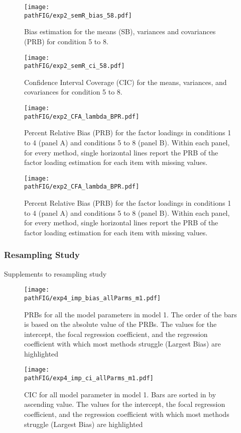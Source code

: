 \documentclass[]{./cls/interact}
\theoremstyle{plain}
\theoremstyle{definition}
\theoremstyle{remark}
\newcommand{\pathFIG}{./figures}
\begin{document}
\begin{figure}
	\centering
	\texttt{[image: \\pathFIG/exp2\_semR\_bias\_58.pdf]}
	\caption{Bias estimation for the means (SB), variances and covariances (PRB) for condition 5 
			to 8.}
	\label{fig:exp2bias58}
\end{figure}

\begin{figure}
	\centering
	\texttt{[image: \\pathFIG/exp2\_semR\_ci\_58.pdf]}
	\caption{Confidence Interval Coverage (CIC) for the means, variances, and covariances 
			for condition 5 to 8.}
	\label{fig:exp2cir58}
\end{figure}

\begin{figure}
	\texttt{[image: \\pathFIG/exp2\_CFA\_lambda\_BPR.pdf]}
	\caption{
		Percent Relative Bias (PRB) for the factor loadings in conditions 1 to 4 (panel A) 
		and conditions 5 to 8 (panel B).
		Within each panel, for every method, single horizontal lines report the PRB of the 
		factor loading estimation for each item with missing values.
		}
\label{fig:exp2fl14}
\end{figure}

\begin{figure}
	\texttt{[image: \\pathFIG/exp2\_CFA\_lambda\_BPR.pdf]}
	\caption{
		Percent Relative Bias (PRB) for the factor loadings in conditions 1 to 4 (panel A) 
		and conditions 5 to 8 (panel B).
		Within each panel, for every method, single horizontal lines report the PRB of the 
		factor loading estimation for each item with missing values.
		}
\label{fig:exp2fl14}
\end{figure}

\FloatBarrier

\subsubsection{Resampling Study}

Supplements to resampling study

\begin{figure}
	\centering
	\texttt{[image: \\pathFIG/exp4\_imp\_bias\_allParms\_m1.pdf]}
	\caption{PRBs for all the model parameters in model 1. 
		The order of the bars is based on the absolute value of the PRBs.
		The values for the intercept, the focal regression coefficient, and the regression coefficient with which most 
		methods struggle (Largest Bias) are highlighted}
	\label{fig:exp4bias_m1}
\end{figure}

\begin{figure}
	\centering
	\texttt{[image: \\pathFIG/exp4\_imp\_ci\_allParms\_m1.pdf]}
	\caption{CIC for all model parameter in model 1.
		Bars are sorted in by ascending value.
		The values for the intercept, the focal regression coefficient, and the regression coefficient with which most 
		methods struggle (Largest Bias) are highlighted}
	\label{fig:exp4cir_m1}
\end{figure}
\end{document}
